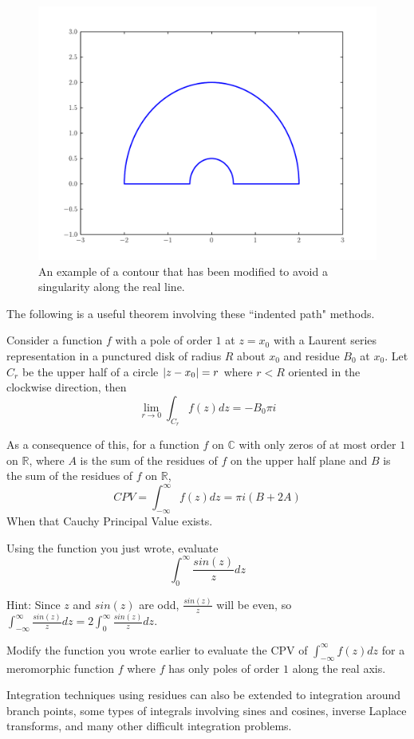 \begin{figure}
\includegraphics[width=\textwidth]{contour2.pdf}
\caption{An example of a contour that has been modified to avoid a singularity along the real line.}
\label{complexint:c2}
\end{figure}

The following is a useful theorem involving these ``indented path" methods.
\begin{theorem}
Consider a function $f$ with a pole of order $1$ at $z=x_0$ with a Laurent series representation in a punctured disk of radius $R$ about $x_0$ and residue $B_0$ at $x_0$.
Let $C_r$ be the upper half of a circle $\left\lvert z-x_0\right\rvert=r$ where $r<R$ oriented in the clockwise direction, then
$$\lim_{r\to 0} \int_{C_r} f(z) dz = - B_0 \pi i$$
\end{theorem}
As a consequence of this, for a function $f$ on $\mathbb{C}$ with only zeros of at most order $1$ on $\mathbb{R}$, where $A$ is the sum of the residues of $f$ on the upper half plane and $B$ is the sum of the residues of $f$ on $\mathbb{R}$, 
$$CPV = \int_{-\infty}^{\infty} f(z) dz = \pi i (B+2A)$$ 
When that Cauchy Principal Value exists.

\begin{problem}
Using the function you just wrote, evaluate
$$\int_{0}^{\infty} \frac{sin(z)}{z} dz$$

Hint: Since $z$ and $sin(z)$ are odd, $\frac{sin(z)}{z}$ will be even, so 
$\int_{-\infty}^{\infty} \frac{sin(z)}{z} dz = 2 \int_{0}^{\infty} \frac{sin(z)}{z} dz$.
\end{problem}


\begin{problem}
Modify the function you wrote earlier to evaluate the CPV of $\int_{-\infty}^{\infty} f(z) dz$ for a meromorphic function $f$ where $f$ has only poles of order $1$ along the real axis.
\end{problem}

Integration techniques using residues can also be extended to integration around branch points, some types of integrals involving sines and cosines, inverse Laplace transforms, and many other difficult integration problems.